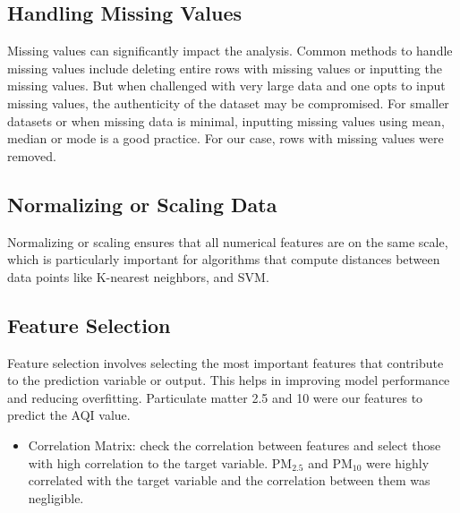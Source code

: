 \documentclass{book}
\numberwithin{equation}{section}
\numberwithin{figure}{section}
\begin{document}
\subsection{Handling Missing Values}
\label{handling}
Missing values can significantly impact the analysis. Common methods to handle missing values include deleting entire rows with missing values or inputting the missing values. But when challenged with very large data and one opts to input missing values, the authenticity of the dataset may be compromised. For smaller datasets or when missing data is minimal, inputting missing values using mean, median or mode is a good practice. For our case, rows with missing values were removed.
\subsection{Normalizing or Scaling Data}
\label{normalizing}
Normalizing or scaling ensures that all numerical features are on the same scale, which is particularly important for algorithms that compute distances between data points like K-nearest neighbors, and SVM.
\subsection{Feature Selection}
\label{feature}
Feature selection involves selecting the most important features that contribute to the prediction variable or output. This helps in improving model performance and reducing overfitting. Particulate matter 2.5 and 10  were our features to predict the  AQI value.\\
\begin{itemize}
\vspace{-5mm} %
\item Correlation Matrix: check the correlation between features and select those with high correlation to the target variable. PM$_{2.5}$ and PM$_{10}$ were highly correlated with the target variable and the correlation between them was negligible. 
\end{itemize}
\end{document}
